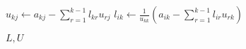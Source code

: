 \documentclass[varwidth]{standalone}
\begin{document}
\begin{algorithmic}[1]
        \State $u_{kj} \gets a_{kj} - \displaystyle\sum_{r=1}^{k-1}l_{kr}u_{rj}$
    \EndFor
        \State $l_{ik} \gets \displaystyle\frac{1}{u_{kk}}\left( a_{ik} - \sum_{r=1}^{k-1}l_{ir}u_{rk} \right)$
    \EndFor
\EndFor

\State \Return $L, U$

\EndFunction
\end{algorithmic}
\end{document}

